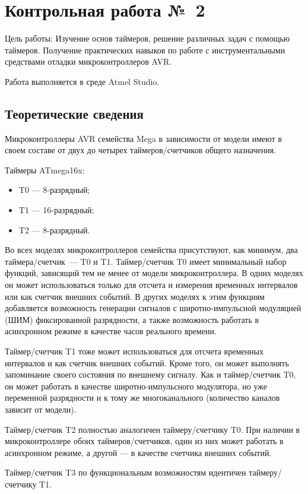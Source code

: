 \documentclass[main.tex]{subfiles}
\begin{document}
\chapter{Контрольная работа №~2}

Цель работы: Изучение основ таймеров, решение различных задач с помощью таймеров. Получение практических навыков по работе с инструментальными средствами отладки микроконтроллеров AVR.

Работа выполняется в среде Atmel Studio.

\section{Теоретические сведения}

Микроконтроллеры AVR семейства Mega в зависимости от модели имеют в своем составе от двух до четырех таймеров/счетчиков общего назначения.

Таймеры ATmega16x:
\begin{itemize}
\item T0 --- 8-разрядный;
\item T1 --- 16-разрядный;
\item T2 --- 8-разрядный.
\end{itemize}

Во всех моделях микроконтроллеров семейства присутствуют, как минимум, два таймера/счетчик~--- T0 и T1. Таймер/счетчик T0 имеет минимальный набор функций, зависящий тем не менее от модели микроконтроллера. В одних моделях он может использоваться только для отсчета и измерения временных интервалов или как счетчик внешних событий. В других моделях к этим функциям добавляется возможность генерации сигналов с широтно-импульсной модуляцией (ШИМ) фиксированной разрядности, а также возможность работать в асинхронном режиме в качестве часов реального времени.

Таймер/счетчик T1 тоже может использоваться для отсчета временных  интервалов и как счетчик внешних событий. Кроме того, он может выполнять запоминание своего состояния по внешнему сигналу. Как и таймер/счетчик T0, он может работать в качестве широтно-импульсного модулятора, но уже переменной разрядности и к тому же многоканального (количество каналов зависит от модели).

Таймер/счетчик T2 полностью аналогичен таймеру/счетчику T0. При наличии в микроконтроллере обоих таймеров/счетчиков, один из них может работать в асинхронном режиме, а другой — в качестве счетчика внешних событий.

Таймер/счетчик T3 по функциональным возможностям идентичен таймеру/счетчику T1.
\end{document}
